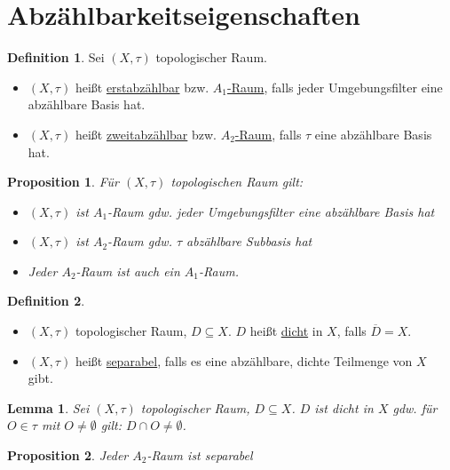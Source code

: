 \documentclass[12pt]{scrartcl}%
\newtheorem{prop}{Proposition}
\newtheorem{lemma}{Lemma}
\theoremstyle{definition}
\newtheorem*{defn}{Definition}
\theoremstyle{remark}
\newcommand{\AR}[1]{$A_#1$-Raum}
\begin{document}
\section*{Abzählbarkeitseigenschaften}

\begin{defn}
    Sei $(X,\tau)$ topologischer Raum.

    \begin{itemize}
        \item $(X,\tau)$ heißt \underline{erstabzählbar} bzw. \underline{\AR{1}}, falls jeder Umgebungsfilter eine abzählbare Basis hat.
        \item $(X,\tau)$ heißt \underline{zweitabzählbar} bzw. \underline{\AR{2}}, falls $\tau$ eine abzählbare Basis hat.
    \end{itemize}
\end{defn}

\begin{prop}
    Für $(X,\tau)$ topologischen Raum gilt:

    \begin{itemize}
        \item $(X,\tau)$ ist \AR{1} gdw. jeder Umgebungsfilter eine abzählbare Basis hat
        \item $(X,\tau)$ ist \AR{2} gdw. $\tau$ abzählbare Subbasis hat
        \item Jeder \AR{2} ist auch ein \AR{1}.
    \end{itemize}
\end{prop}

\begin{defn}
    \begin{itemize}
        \item $(X,\tau)$ topologischer Raum, $D\subseteq X$. $D$ heißt \underline{dicht} in $X$, falls $\overline{D}=X$.
        \item $(X,\tau)$ heißt \underline{separabel}, falls es eine abzählbare, dichte Teilmenge von $X$ gibt.
    \end{itemize}
\end{defn}

\begin{lemma}
    Sei $(X,\tau)$ topologischer Raum, $D\subseteq X$. $D$ ist dicht in $X$ gdw. für $O\in \tau$ mit $O\neq \emptyset$ gilt: $D\cap O \neq \emptyset$.
\end{lemma}

\begin{prop}
    Jeder \AR{2} ist separabel
\end{prop}
\end{document}
